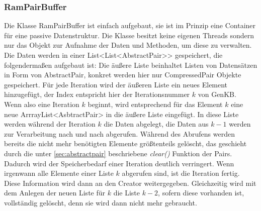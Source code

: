 \documentclass[12pt,a4paper]{article}
\begin{document}
\subsubsection{RamPairBuffer}
\label{sec:rampairbuffer}
Die Klasse  RamPairBuffer ist einfach aufgebaut, sie ist im Prinzip eine Container für eine passive Datenstruktur. Die Klasse besitzt keine eigenen Threads sondern nur das Objekt zur Aufnahme der Daten und Methoden, um diese zu verwalten. Die Daten werden in einer List<List<AbstractPair>> gespeichert, die folgendermaßen aufgebaut ist: Die äußere Liste beinhaltet Listen von Datensätzen in Form von AbstractPair, konkret werden hier nur CompressedPair Objekte gespeichert. Für jede Iteration wird der äußeren Liste ein neues Element hinzugefügt, der Index entspricht hier der Iterationsnummer $k$ von GenKB. \\
Wenn also eine Iteration $k$ beginnt, wird entsprechend für das Element $k$ eine neue ArrrayList<AsbtractPair> in die äußere Liste eingefügt. In diese Liste werden während der Iteration $k$ die Daten abgelegt, die Daten aus $k-1$ werden zur Verarbeitung nach und nach abgerufen. Während des Abrufens werden bereits die nicht mehr benötigten Elemente größtenteils gelöscht, das geschieht durch die unter \autoref{sec:abstractpair} beschriebene \textit{clear()} Funktion der Pairs. Dadurch wird der Speicherbedarf einer Iteration deutlich verringert. Wenn irgenwann alle Elemente einer Liste $k$ abgerufen sind, ist die Iteration fertig. Diese Information wird dann an den Creator weitergegeben. Gleichzeitig wird mit dem Anlegen der neuen Liste für $k$ die Liste $k-2$, sofern diese vorhanden ist, vollständig gelöscht, denn sie wird dann  nicht mehr gebraucht.
\end{document}
